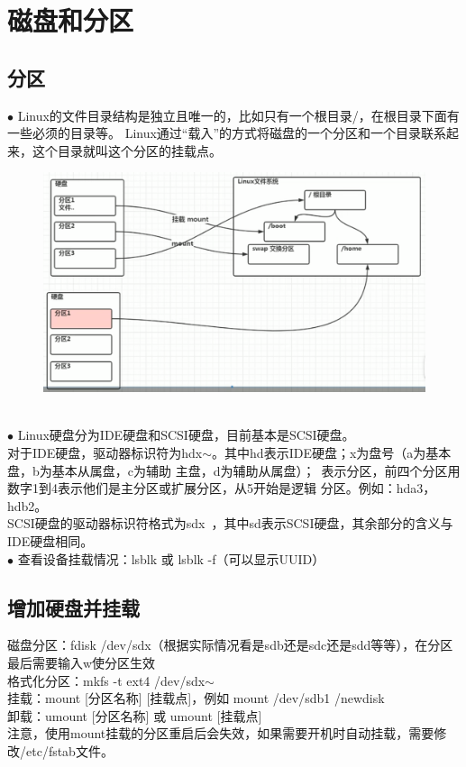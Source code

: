 \documentclass[11pt]{article}
\begin{document}
\section{磁盘和分区}
\subsection{分区}
$\bullet$ Linux的文件目录结构是独立且唯一的，比如只有一个根目录/，在根目录下面有一些必须的目录等。
Linux通过“载入”的方式将磁盘的一个分区和一个目录联系起来，这个目录就叫这个分区的挂载点。 \\
\begin{figure}[htb]
    \centering
    \includegraphics[scale=0.27]{imgs/parts.png}
\end{figure} \\
$\bullet$ Linux硬盘分为IDE硬盘和SCSI硬盘，目前基本是SCSI硬盘。 \\
对于IDE硬盘，驱动器标识符为hdx$\sim$。其中hd表示IDE硬盘；x为盘号（a为基本盘，b为基本从属盘，c为辅助
主盘，d为辅助从属盘）；~表示分区，前四个分区用数字1到4表示他们是主分区或扩展分区，从5开始是逻辑
分区。例如：hda3，hdb2。\\
SCSI硬盘的驱动器标识符格式为sdx~，其中sd表示SCSI硬盘，其余部分的含义与IDE硬盘相同。
\\
$\bullet$ 查看设备挂载情况：lsblk 或 lsblk -f（可以显示UUID）

\subsection{增加硬盘并挂载}
磁盘分区：fdisk /dev/sdx（根据实际情况看是sdb还是sdc还是sdd等等），在分区最后需要输入w使分区生效  \\
格式化分区：mkfs -t ext4 /dev/sdx$\sim$  \\
挂载：mount [分区名称] [挂载点]，例如 mount /dev/sdb1 /newdisk  \\
卸载：umount [分区名称] 或 umount [挂载点]  \\
注意，使用mount挂载的分区重启后会失效，如果需要开机时自动挂载，需要修改/etc/fstab文件。
\end{document}

